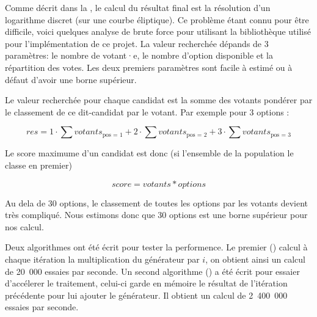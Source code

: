 \documentclass[../report]{subfiles}
\begin{document}
Comme décrit dans la , le calcul du résultat final est la résolution d'un logarithme discret (sur une courbe éliptique).
Ce problème étant connu pour être difficile, voici quelques analyse de brute force pour utilisant la bibliothèque utilisé
pour l'implémentation de ce projet.
La valeur recherchée dépands de 3 paramètres: le nombre de votant·e, le nombre d'option disponible et la répartition des votes.
Les deux premiers paramètres sont facile à estimé ou à défaut d'avoir une borne supérieur.

Le valeur recherchée pour chaque candidat est la somme des votants pondérer par le classement de ce dit-candidat par le votant.
Par exemple pour 3 options :

\[
  res = 1 \cdot \sum votants_{\text{pos = 1}}
      + 2 \cdot \sum votants_{\text{pos = 2}}
      + 3 \cdot \sum votants_{\text{pos = 3}}
\]

Le score maximume d'un candidat est donc (si l'ensemble de la population le classe en premier)

\[
  score = votants * options 
\]

Au dela de 30 options, le classement de toutes les options par les votants devient très compliqué.
Nous estimons donc que 30 options est une borne supérieur pour nos calcul.

Deux algorithmes ont été écrit pour tester la performence.
Le premier () calcul à chaque itération la multiplication du générateur 
par $i$, on obtient ainsi un calcul de 20~000 essaies par seconde.
Un second algorithme () a été écrit pour essaier d'accélerer le 
traitement, celui-ci garde en mémoire le résultat de l'itération précédente pour lui ajouter le générateur.
Il obtient un calcul de 2~400~000 essaies par seconde.
\end{document}
